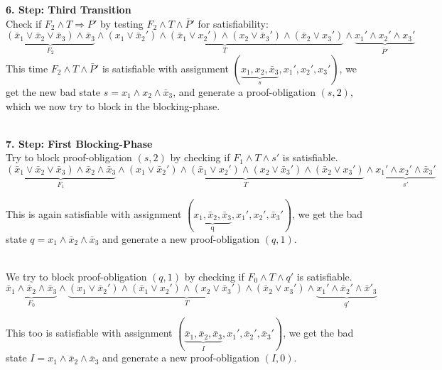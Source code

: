 \documentclass[11pt, a4paper, BCOR=10mm, ngerman, oneside]{scrbook}
\begin{document}
\textbf{6. Step: Third Transition} \\ Check if $F_2 \land T \Rightarrow P'$ by testing $F_2 \land T \land \bar P'$ for satisfiability:
\begin{equation*}
\underbrace{(\bar x_1 \lor \bar x_2 \lor \bar x_3) \land \bar x_3}_{F_2} \land \underbrace{(x_1 \lor \bar x_2' ) \land ( \bar x_1 \lor x_2') \land (x_2 \lor \bar x_3') \land ( \bar x_2 \lor x_3')}_{T} \land \underbrace{x_1' \land x_2' \land x_3'}_{ \bar P'}
\end{equation*}
This time $F_2 \land T \land \bar P'$ is satisfiable with assignment $( \underbrace{x_1, x_2, \bar x_3}_{s}, x_1', x_2', x_3')$, we get the new bad state $s = x_1 \land x_2 \land \bar x_3$, and generate a proof-obligation $(s, 2)$, which we now try to block in the blocking-phase. \\ \\ \par

\textbf{7. Step: First Blocking-Phase} \\ Try to block proof-obligation $(s, 2)$ by checking if $F_1 \land T \land s'$ is satisfiable.
\begin{equation*}
\underbrace{(\bar x_1 \lor \bar x_2 \lor \bar x_3) \land \bar x_2 \land \bar x_3}_{F_1} \land \underbrace{(x_1 \lor \bar x_2' ) \land ( \bar x_1 \lor x_2') \land (x_2 \lor \bar x_3') \land ( \bar x_2 \lor x_3')}_{T} \land \underbrace{x_1' \land x_2' \land \bar x_3'}_{ s'}
\end{equation*}

This is again satisfiable with assignment $(\underbrace{x_1, \bar x_2, \bar x_3}_{\text{q}}, x_1', x_2', \bar x_3')$, we get the bad state $q = x_1 \land \bar x_2 \land \bar x_3$ and generate a new proof-obligation $(q, 1)$. \\ \\ \par

We try to block proof-obligation $(q, 1)$ by checking if $F_0 \land T \land q'$ is satisfiable.
\begin{equation*}
\underbrace{\bar x_1 \land \bar x_2 \land \bar x_3}_{F_0} \land \underbrace{(x_1 \lor \bar x_2' ) \land ( \bar x_1 \lor x_2') \land (x_2 \lor \bar x_3') \land ( \bar x_2 \lor x_3')}_{T} \land \underbrace{x_1' \land \bar x_2' \land \bar x'_3}_{ q'}
\end{equation*}

This too is satisfiable with assignment $(\underbrace{\bar x_1, \bar x_2, \bar x_3}_{I}, x_1', \bar x_2', \bar x_3')$, we get the bad state $I = x_1 \land \bar x_2 \land \bar x_3$ and generate a new proof-obligation $(I, 0)$.
\end{document}
